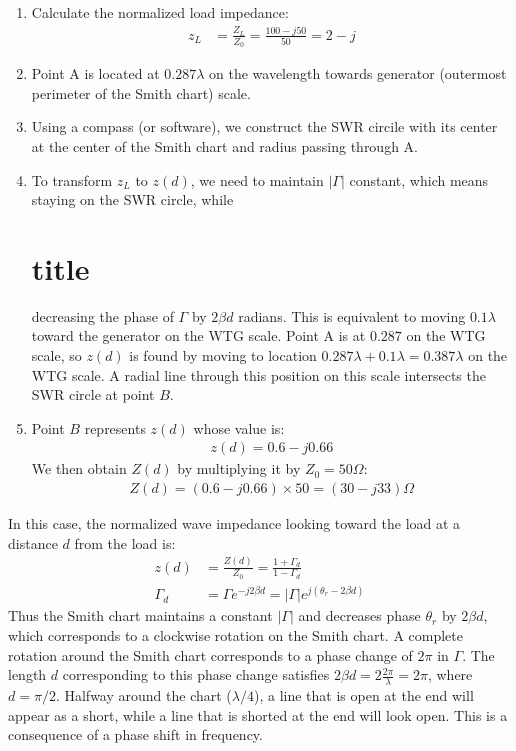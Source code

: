 \documentclass{book}
\begin{document}
\begin{enumerate}
	\item Calculate the normalized load impedance:
	\begin{align*}
		z_L &= \frac{Z_L}{Z_0} = \frac{100 - j50}{50} = 2 - j
	\end{align*}
	\item Point A is located at $0.287 \lambda$ on the wavelength towards generator (outermost perimeter of the Smith chart) scale.
	\item  Using a compass (or software), we construct the SWR circile with its center at the center of the Smith chart and radius passing through A.
	\item To transform $z_L$ to $z(d)$, we need to maintain $|\Gamma|$ constant, which means staying on the SWR circle, while\part{title} decreasing the phase of $\Gamma$ by $2\beta d$ radians. This is equivalent to moving $0.1 \lambda$ toward the generator on the WTG scale. Point A is at $0.287$ on the WTG scale, so $z(d)$ is found by moving to location $0.287 \lambda+ 0.1 \lambda=0.387 \lambda$ on the WTG scale. A radial line through this position on this scale intersects the SWR circle at point $B$.
	\item Point $B$ represents $z(d)$ whose value is:
	\begin{align*}
		z(d) = 0.6-j0.66
	\end{align*}
	We then obtain $Z(d)$ by multiplying it by $Z_0= 50 \Omega$:
	\begin{align*}
		Z(d) = (0.6 - j0.66)\times 50 = (30-j33)\Omega
	\end{align*} 
\end{enumerate}

In this case, the normalized wave impedance looking toward the load at a distance $d$ from the load is:
\begin{align*}
	z(d) &= \frac{Z(d)}{Z_0} = \frac{1+\Gamma_d}{1- \Gamma_d} \\
	\Gamma_d &= \Gamma e^{-j2\beta d}  = |\Gamma|e^{j(\theta_r - 2\beta d)}
\end{align*}
Thus the Smith chart maintains a constant $|\Gamma|$ and decreases phase $\theta_r$ by $2\beta d$, which corresponds to a clockwise rotation on the Smith chart. A complete rotation around the Smith chart corresponds to a phase change of $2\pi$ in $\Gamma$. The length $d$ corresponding to this phase change satisfies $2\beta d = 2 \frac{2\pi}{\lambda}=2\pi$, where $d=\pi /2$. Halfway around the chart ($\lambda/4$), a line that is open at the end will appear as a short, while a line that is shorted at the end will look open. This is a consequence of a phase shift in frequency.
\end{document}
